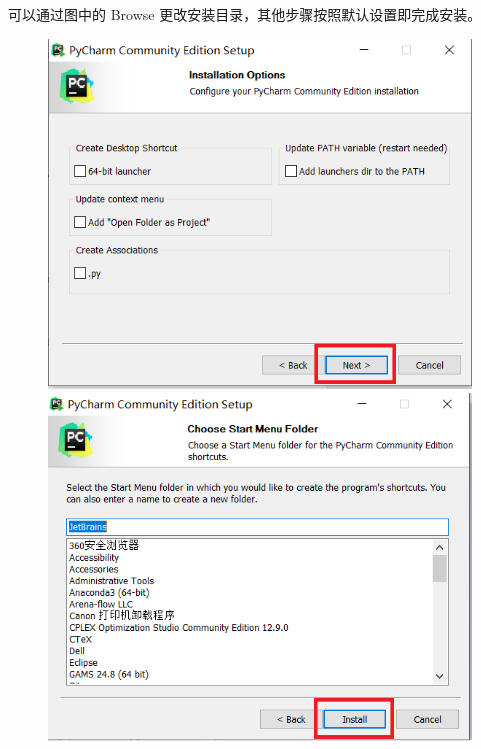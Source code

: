 可以通过图中的 Browse 更改安装目录，其他步骤按照默认设置即完成安装。
\begin{figure}[!ht]
  \centering
  \includegraphics[scale=0.5]{figure/chapter1/pycharm6.png}\quad
  \includegraphics[scale=0.5]{figure/chapter1/pycharm7.png}
\end{figure}

